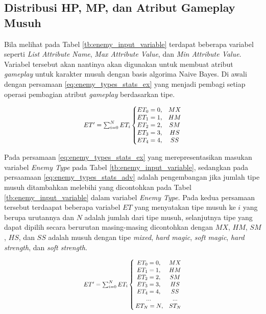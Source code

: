 \subsection{Distribusi HP, MP, dan Atribut Gameplay Musuh}
\label{sec:sub_sec3_enemy_hp_mp_stats}
\vspace{1ex}

Bila melihat pada Tabel \ref{tb:enemy_input_variable} terdapat beberapa variabel seperti \textit{List Attribute Name}, \textit{Max Attribute Value}, dan \textit{Min Attribute Value}. Variabel tersebut akan nantinya akan digunakan untuk membuat atribut \textit{gameplay} untuk karakter musuh dengan basis algorima Naive Bayes. Di awali dengan persamaan \ref{eq:enemy_types_stats_ex} yang menjadi pembagi setiap operasi pembagian atribut \textit{gameplay} berdasarkan tipe.
\vspace{1ex}

\begin{equation}\label{eq:enemy_types_stats_ex}
\resizebox{0.4\textwidth}{!}{%
	$ET' = \sum_{i= 0}^{N} ET_{i} \left\{\begin{matrix}
	ET_{0} = 0, & MX\\ 
	ET_{1} = 1, & HM\\ 
	ET_{2} = 2, & SM\\ 
	ET_{3} = 3, & HS\\
	ET_{4} = 4, & SS
	\end{matrix}\right.$%
}
\end{equation}

Pada persamaan \ref{eq:enemy_types_stats_ex} yang merepresentasikan masukan variabel \textit{Enemy Type} pada Tabel \ref{tb:enemy_input_variable}, sedangkan pada persaamaan \ref{eq:enemy_types_stats_adv} adalah pengembangan jika jumlah tipe musuh ditambahkan melebihi yang dicontohkan pada Tabel \ref{tb:enemy_input_variable} dalam variabel \textit{Enemy Type}. Pada kedua persamaan tersebut terdaapat beberapa variabel $ET$ yang menyatakan tipe musuh ke $i$ yang berupa urutannya dan $N$ adalah jumlah dari tipe musuh, selanjutnya tipe yang dapat dipilih secara berurutan masing-masing dicontohkan dengan $MX$, $HM$, $SM$, $HS$, dan $SS$ adalah musuh dengan tipe \textit{mixed}, \textit{hard magic}, \textit{soft magic}, \textit{hard strength}, dan \textit{soft strength}.
\vspace{1ex}

\begin{equation}
\label{eq:enemy_types_stats_adv}
\resizebox{0.4\textwidth}{!}{%
	$ET' = \sum_{i= 0}^{N} ET_{i} \left\{\begin{matrix}
	ET_{0} = 0, & MX\\ 
	ET_{1} = 1, & HM\\ 
	ET_{2} = 2, & SM\\ 
	ET_{3} = 3, & HS\\ 
	ET_{4} = 4, & SS\\
	... & ... \\
	\hspace{0.2em} ET_{N} = N, & ST_{N}
	\end{matrix}\right.$%
}
\end{equation}

